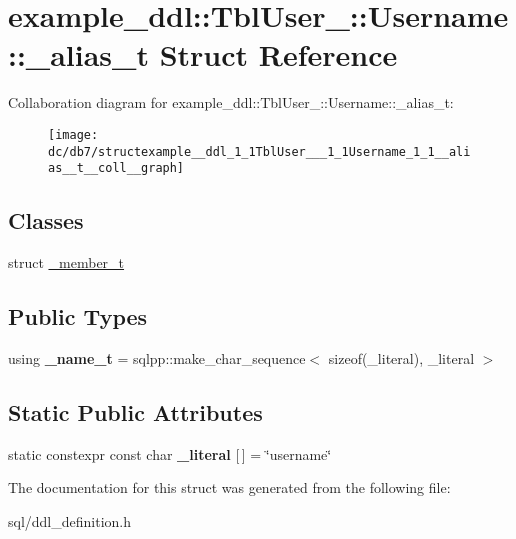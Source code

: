 \hypertarget{structexample__ddl_1_1TblUser___1_1Username_1_1__alias__t}{}\section{example\+\_\+ddl\+:\+:Tbl\+User\+\_\+\+:\+:Username\+:\+:\+\_\+alias\+\_\+t Struct Reference}
\label{structexample__ddl_1_1TblUser___1_1Username_1_1__alias__t}


Collaboration diagram for example\+\_\+ddl\+:\+:Tbl\+User\+\_\+\+:\+:Username\+:\+:\+\_\+alias\+\_\+t\+:
\nopagebreak
\begin{figure}[H]
\begin{center}
\leavevmode
\texttt{[image: dc/db7/structexample\_\_ddl\_1\_1TblUser\_\_\_1\_1Username\_1\_1\_\_alias\_\_t\_\_coll\_\_graph]}
\end{center}
\end{figure}
\subsection*{Classes}
\begin{DoxyCompactItemize}
\item 
struct \hyperlink{structexample__ddl_1_1TblUser___1_1Username_1_1__alias__t_1_1__member__t}{\+\_\+member\+\_\+t}
\end{DoxyCompactItemize}
\subsection*{Public Types}
\begin{DoxyCompactItemize}
\item 
\hypertarget{structexample__ddl_1_1TblUser___1_1Username_1_1__alias__t_a7d2f841db16c9e5d314036ee7ec36889}{}using {\bfseries \+\_\+name\+\_\+t} = sqlpp\+::make\+\_\+char\+\_\+sequence$<$ sizeof(\+\_\+literal), \+\_\+literal $>$\label{structexample__ddl_1_1TblUser___1_1Username_1_1__alias__t_a7d2f841db16c9e5d314036ee7ec36889}

\end{DoxyCompactItemize}
\subsection*{Static Public Attributes}
\begin{DoxyCompactItemize}
\item 
\hypertarget{structexample__ddl_1_1TblUser___1_1Username_1_1__alias__t_aafdf0a88fd836e6ce668fc264b907a8b}{}static constexpr const char {\bfseries \+\_\+literal} \mbox{[}$\,$\mbox{]} = \char`\"{}username\char`\"{}\label{structexample__ddl_1_1TblUser___1_1Username_1_1__alias__t_aafdf0a88fd836e6ce668fc264b907a8b}

\end{DoxyCompactItemize}


The documentation for this struct was generated from the following file\+:\begin{DoxyCompactItemize}
\item 
sql/ddl\+\_\+definition.\+h\end{DoxyCompactItemize}
